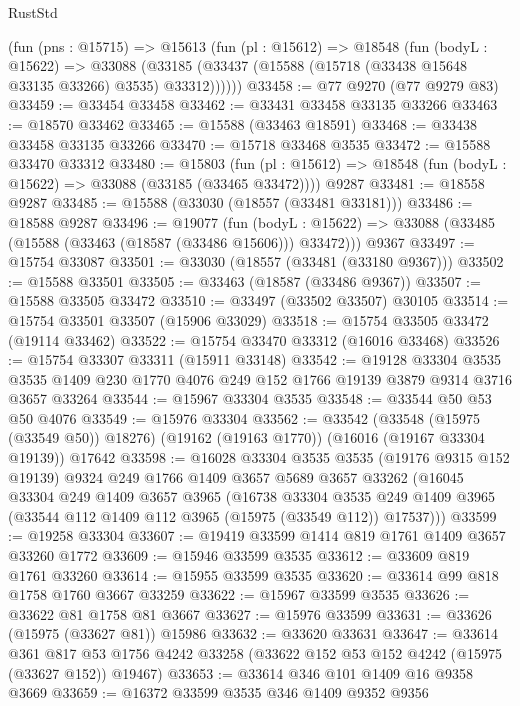 \begin{lexlean}{RustStd}
\begin{coremodule}
    (fun (pns : @15715) =>
    @15613
      (fun (pl : @15612) =>
      @18548
        (fun (bodyL : @15622) =>
        @33088 (@33185 (@33437 (@15588 (@15718 (@33438 @15648 @33135 @33266) @3535) @33312))))))
@33458 := @77 @9270 (@77 @9279 @83)
@33459 := @33454 @33458
@33462 := @33431 @33458 @33135 @33266
@33463 := @18570 @33462
@33465 := @15588 (@33463 @18591)
@33468 := @33438 @33458 @33135 @33266
@33470 := @15718 @33468 @3535
@33472 := @15588 @33470 @33312
@33480 := @15803
    (fun (pl : @15612) => @18548 (fun (bodyL : @15622) => @33088 (@33185 (@33465 @33472))))
    @9287
@33481 := @18558 @9287
@33485 := @15588 (@33030 (@18557 (@33481 @33181)))
@33486 := @18588 @9287
@33496 := @19077
    (fun (bodyL : @15622) => @33088 (@33485 (@15588 (@33463 (@18587 (@33486 @15606))) @33472)))
    @9367
@33497 := @15754 @33087
@33501 := @33030 (@18557 (@33481 (@33180 @9367)))
@33502 := @15588 @33501
@33505 := @33463 (@18587 (@33486 @9367))
@33507 := @15588 @33505 @33472
@33510 := @33497 (@33502 @33507) @30105
@33514 := @15754 @33501 @33507 (@15906 @33029)
@33518 := @15754 @33505 @33472 (@19114 @33462)
@33522 := @15754 @33470 @33312 (@16016 @33468)
@33526 := @15754 @33307 @33311 (@15911 @33148)
@33542 := @19128
    @33304
    @3535
    @3535
    @1409
    @230
    @1770
    @4076
    @249
    @152
    @1766
    @19139
    @3879
    @9314
    @3716
    @3657
    @33264
@33544 := @15967 @33304 @3535
@33548 := @33544 @50 @53 @50 @4076
@33549 := @15976 @33304
@33562 := @33542
    (@33548 (@15975 (@33549 @50)) @18276)
    (@19162 (@19163 @1770))
    (@16016 (@19167 @33304 @19139))
    @17642
@33598 := @16028
    @33304
    @3535
    @3535
    (@19176 @9315 @152 @19139)
    @9324
    @249
    @1766
    @1409
    @3657
    @5689
    @3657
    @33262
    (@16045
      @33304
      @249
      @1409
      @3657
      @3965
      (@16738
        @33304
        @3535
        @249
        @1409
        @3965
        (@33544 @112 @1409 @112 @3965 (@15975 (@33549 @112)) @17537)))
@33599 := @19258 @33304
@33607 := @19419 @33599 @1414 @819 @1761 @1409 @3657 @33260 @1772
@33609 := @15946 @33599 @3535
@33612 := @33609 @819 @1761 @33260
@33614 := @15955 @33599 @3535
@33620 := @33614 @99 @818 @1758 @1760 @3667 @33259
@33622 := @15967 @33599 @3535
@33626 := @33622 @81 @1758 @81 @3667
@33627 := @15976 @33599
@33631 := @33626 (@15975 (@33627 @81)) @15986
@33632 := @33620 @33631
@33647 := @33614
    @361
    @817
    @53
    @1756
    @4242
    @33258
    (@33622 @152 @53 @152 @4242 (@15975 (@33627 @152)) @19467)
@33653 := @33614 @346 @101 @1409 @16 @9358 @3669
@33659 := @16372 @33599 @3535 @346 @1409 @9352 @9356

\end{coremodule}
\end{lexlean}
